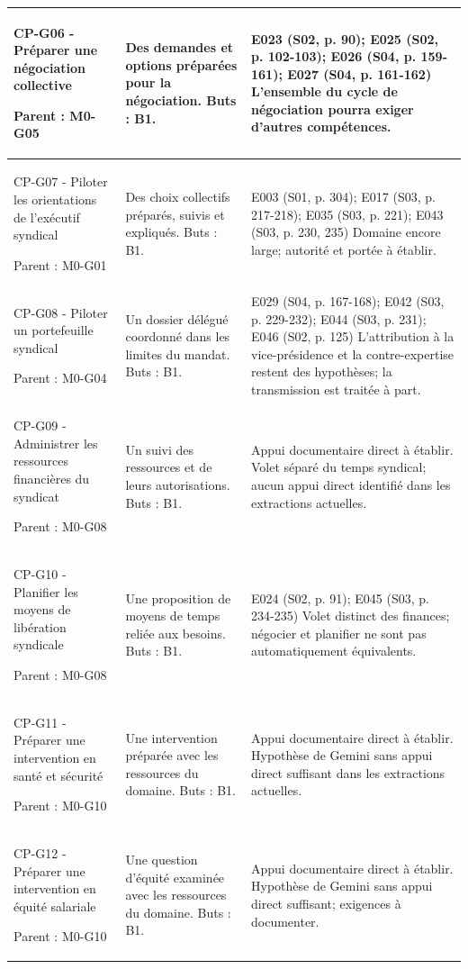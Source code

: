 \documentclass[9pt,a4paper,landscape]{extarticle}
\begin{document}
\begin{longtable}{|p{61mm}|p{84mm}|p{115mm}|}
CP-G06 - Préparer une négociation collective\par Parent : M0-G05 & Des demandes et options préparées pour la négociation. Buts : B1. & E023 (S02, p. 90); E025 (S02, p. 102-103); E026 (S04, p. 159-161); E027 (S04, p. 161-162) L’ensemble du cycle de négociation pourra exiger d’autres compétences.\\\hline
CP-G07 - Piloter les orientations de l’exécutif syndical\par Parent : M0-G01 & Des choix collectifs préparés, suivis et expliqués. Buts : B1. & E003 (S01, p. 304); E017 (S03, p. 217-218); E035 (S03, p. 221); E043 (S03, p. 230, 235) Domaine encore large; autorité et portée à établir.\\\hline
CP-G08 - Piloter un portefeuille syndical\par Parent : M0-G04 & Un dossier délégué coordonné dans les limites du mandat. Buts : B1. & E029 (S04, p. 167-168); E042 (S03, p. 229-232); E044 (S03, p. 231); E046 (S02, p. 125) L’attribution à la vice-présidence et la contre-expertise restent des hypothèses; la transmission est traitée à part.\\\hline
CP-G09 - Administrer les ressources financières du syndicat\par Parent : M0-G08 & Un suivi des ressources et de leurs autorisations. Buts : B1. & Appui documentaire direct à établir. Volet séparé du temps syndical; aucun appui direct identifié dans les extractions actuelles.\\\hline
CP-G10 - Planifier les moyens de libération syndicale\par Parent : M0-G08 & Une proposition de moyens de temps reliée aux besoins. Buts : B1. & E024 (S02, p. 91); E045 (S03, p. 234-235) Volet distinct des finances; négocier et planifier ne sont pas automatiquement équivalents.\\\hline
CP-G11 - Préparer une intervention en santé et sécurité\par Parent : M0-G10 & Une intervention préparée avec les ressources du domaine. Buts : B1. & Appui documentaire direct à établir. Hypothèse de Gemini sans appui direct suffisant dans les extractions actuelles.\\\hline
CP-G12 - Préparer une intervention en équité salariale\par Parent : M0-G10 & Une question d’équité examinée avec les ressources du domaine. Buts : B1. & Appui documentaire direct à établir. Hypothèse de Gemini sans appui direct suffisant; exigences à documenter.\\\hline

\end{longtable}
\end{document}
